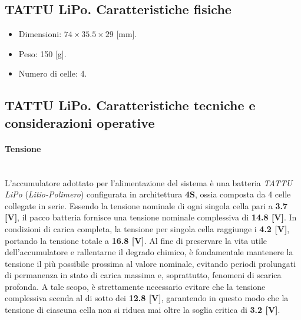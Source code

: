 \documentclass[11pt]{report}
\begin{document}
	\subsection{TATTU LiPo. Caratteristiche fisiche}
	\begin{itemize}
		\item Dimensioni: $74\times 35.5\times 29$ [mm].
		\item Peso: 150 [g].
		\item Numero di celle: 4.
	\end{itemize}
	
	\subsection{TATTU LiPo. Caratteristiche tecniche e considerazioni operative}
	
	\paragraph{Tensione}\mbox{}\\
	L'accumulatore adottato per l'alimentazione del sistema è una batteria \textit{TATTU LiPo} (\textit{Litio-Polimero}) configurata in architettura \textbf{4S}, ossia composta da 4 celle collegate in serie. Essendo la tensione nominale di ogni singola cella pari a \textbf{3.7 [V]}, il pacco batteria fornisce una tensione nominale complessiva di \textbf{14.8 [V]}. In condizioni di carica completa, la tensione per singola cella raggiunge i \textbf{4.2 [V]}, portando la tensione totale a \textbf{16.8 [V]}. Al fine di preservare la vita utile dell'accumulatore e rallentarne il degrado chimico, è fondamentale mantenere la tensione il più possibile prossima al valore nominale, evitando periodi prolungati di permanenza in stato di carica massima e, soprattutto, fenomeni di scarica profonda. A tale scopo, è strettamente necessario evitare che la tensione complessiva scenda al di sotto dei \textbf{12.8 [V]}, garantendo in questo modo che la tensione di ciascuna cella non si riduca mai oltre la soglia critica di \textbf{3.2 [V]}.
	
\end{document}
